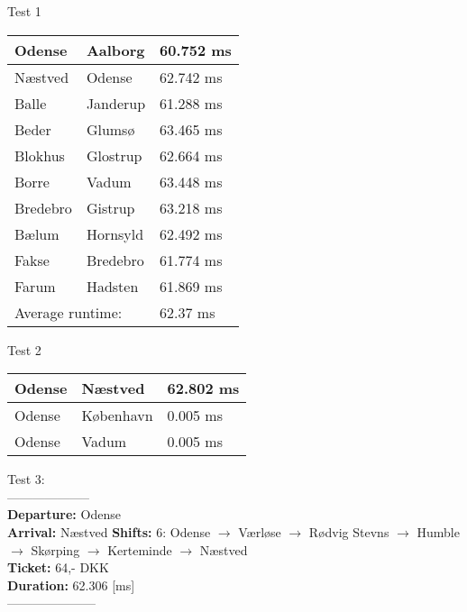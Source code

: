 \documentclass[10pt,a4paper]{article}
\begin{document}
Test 1
\begin{table}[h]
\begin{tabular}{lll}
\hline
\multicolumn{1}{|l|}{Odense} & \multicolumn{1}{l|}{Aalborg} & \multicolumn{1}{l|}{60.752 ms}  \\ \hline
\multicolumn{1}{|l|}{Næstved} & \multicolumn{1}{l|}{Odense} & \multicolumn{1}{l|}{62.742 ms}  \\ \hline
\multicolumn{1}{|l|}{Balle} & \multicolumn{1}{l|}{Janderup} & \multicolumn{1}{l|}{61.288 ms}  \\ \hline
\multicolumn{1}{|l|}{Beder} & \multicolumn{1}{l|}{Glumsø} & \multicolumn{1}{l|}{63.465 ms}  \\ \hline
\multicolumn{1}{|l|}{Blokhus} & \multicolumn{1}{l|}{Glostrup} & \multicolumn{1}{l|}{62.664 ms}  \\ \hline
\multicolumn{1}{|l|}{Borre} & \multicolumn{1}{l|}{Vadum} & \multicolumn{1}{l|}{63.448 ms}  \\ \hline
\multicolumn{1}{|l|}{Bredebro} & \multicolumn{1}{l|}{Gistrup} & \multicolumn{1}{l|}{63.218 ms}  \\ \hline
\multicolumn{1}{|l|}{Bælum} & \multicolumn{1}{l|}{Hornsyld} & \multicolumn{1}{l|}{62.492 ms}  \\ \hline
\multicolumn{1}{|l|}{Fakse} & \multicolumn{1}{l|}{Bredebro} & \multicolumn{1}{l|}{61.774 ms}  \\ \hline
\multicolumn{1}{|l|}{Farum} & \multicolumn{1}{l|}{Hadsten} & \multicolumn{1}{l|}{61.869 ms}  \\ \hline
\multicolumn{2}{|l|}{Average runtime: } & \multicolumn{1}{|l|}{62.37 ms }    \\ \hline
\end{tabular}
\end{table}

Test 2
\begin{table}[h]
\begin{tabular}{lll}
\hline
\multicolumn{1}{|l|}{Odense} & \multicolumn{1}{l|}{Næstved} & \multicolumn{1}{l|}{62.802 ms}  \\ \hline
\multicolumn{1}{|l|}{Odense} & \multicolumn{1}{l|}{København} & \multicolumn{1}{l|}{0.005 ms}  \\ \hline
\multicolumn{1}{|l|}{Odense} & \multicolumn{1}{l|}{Vadum} & \multicolumn{1}{l|}{0.005 ms}   \\ \hline
\end{tabular}
\end{table}

Test 3: \\
-------------------- \\
\textbf{Departure:} Odense \\
\textbf{Arrival:}   Næstved
\textbf{Shifts:}    6: Odense $\rightarrow$ Værløse $\rightarrow$ Rødvig Stevns $\rightarrow$ Humble $\rightarrow$ Skørping $\rightarrow$ Kerteminde $\rightarrow$ Næstved\\
\textbf{Ticket:}    64,- DKK \\
\textbf{Duration:}  62.306 [ms] \\
--------------------- \\
\end{document}

